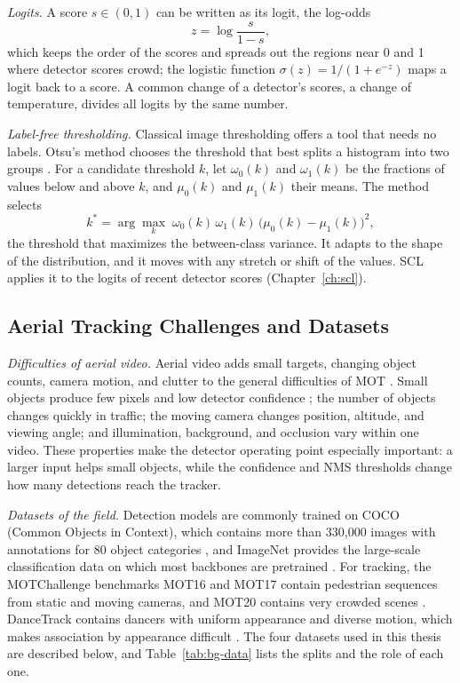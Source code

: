 \emph{Logits.} A score $s\in(0,1)$ can be written as its logit, the log-odds
\begin{equation}
z=\log\frac{s}{1-s},
\label{eq:bg-logit}
\end{equation}
which keeps the order of the scores and spreads out the regions near 0 and 1 where detector scores crowd; the logistic function $\sigma(z)=1/(1+e^{-z})$ maps a logit back to a score. A common change of a detector's scores, a change of temperature, divides all logits by the same number.

\emph{Label-free thresholding.} Classical image thresholding offers a tool that needs no labels. Otsu's method chooses the threshold that best splits a histogram into two groups \cite{goh2018otsu}. For a candidate threshold $k$, let $\omega_0(k)$ and $\omega_1(k)$ be the fractions of values below and above $k$, and $\mu_0(k)$ and $\mu_1(k)$ their means. The method selects
\begin{equation}
k^{*}=\arg\max_{k}\;\omega_0(k)\,\omega_1(k)\,\bigl(\mu_0(k)-\mu_1(k)\bigr)^2,
\label{eq:bg-otsu}
\end{equation}
the threshold that maximizes the between-class variance. It adapts to the shape of the distribution, and it moves with any stretch or shift of the values. SCL applies it to the logits of recent detector scores (Chapter~\ref{ch:scl}).

\subsection{Aerial Tracking Challenges and Datasets}\label{sec:bg-datasets}
\emph{Difficulties of aerial video.} Aerial video adds small targets, changing object counts, camera motion, and clutter to the general difficulties of MOT \cite{zhu2022visdrone,du2018uavdt}. Small objects produce few pixels and low detector confidence \cite{cheng2023smallobject}; the number of objects changes quickly in traffic; the moving camera changes position, altitude, and viewing angle; and illumination, background, and occlusion vary within one video. These properties make the detector operating point especially important: a larger input helps small objects, while the confidence and NMS thresholds change how many detections reach the tracker.

\emph{Datasets of the field.} Detection models are commonly trained on COCO (Common Objects in Context), which contains more than 330,000 images with annotations for 80 object categories \cite{lin2014coco}, and ImageNet provides the large-scale classification data on which most backbones are pretrained \cite{russakovsky2015imagenet}. For tracking, the MOTChallenge benchmarks MOT16 and MOT17 \cite{milan2016mot16,dendorfer2021motchallenge} contain pedestrian sequences from static and moving cameras, and MOT20 contains very crowded scenes \cite{dendorfer2020mot20}. DanceTrack contains dancers with uniform appearance and diverse motion, which makes association by appearance difficult \cite{sun2022dancetrack}. The four datasets used in this thesis are described below, and Table~\ref{tab:bg-data} lists the splits and the role of each one.

